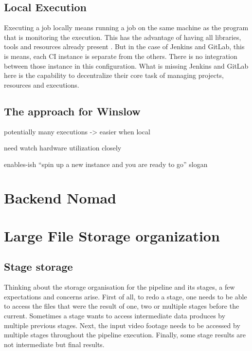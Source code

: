
\subsection{Local Execution}

Executing a job locally means running a job on the same machine as the program that is monitoring the execution.
This has the advantage of having all libraries, tools and resources already present .
But in the case of Jenkins and GitLab, this is means, each CI instance is separate from the others.
There is no integration between those instance in this configuration.
What is missing Jenkins and GitLab here is the capability to decentralize their core task of managing projects, resources and executions.



\subsection{The approach for Winslow}


potentially many executions -> easier when local

need watch hardware utilization closely

enables-ish \enquote{spin up a new instance and you are ready to go} slogan



\section{Backend Nomad}


\section{Large File Storage organization}

\subsection{Stage storage}


Thinking about the storage organisation for the pipeline and its stages, a few expectations and concerns arise.
First of all, to redo a stage, one needs to be able to access the files that were the result of one, two or multiple stages before the current.
Sometimes a stage wants to access intermediate data produces by multiple previous stages.
Next, the input video footage needs to be accessed by multiple stages throughout the pipeline execution.
Finally, some stage results are not intermediate but final results.

